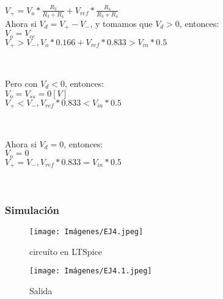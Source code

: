         $V_{+} = V_{o}*\frac{R_{3}}{R_{3} + R_{4}} + V_{ref}*\frac{R_{4}}{R_{3} + R_{4}}$\\

        Ahora si $V_{d} = V_{+} - V_{-}$, y tomamos que  $V_{d} > 0$, entonces:\\

        $V_{o} = V_{cc}$\\
        
        $V_{+} > V_{-},   V_{o}*0.166 + V_{ref}*0.833 > V_{in}*0.5$\\

        \begin{center}
            \\
        \end{center}


        Pero con $V_{d} < 0$, entonces:\\

        $V_{o} = V_{ss} = 0[V]$\\
        
        $V_{+} < V_{-},  V_{ref}*0.833 < V_{in}*0.5$\\

        \begin{center}
            \\
        \end{center}

        Ahora si $V_{d} = 0$, entonces:\\

        $V_{o} = 0$\\
        
        $V_{+} = V_{-}, V_{ref}*0.833 = V_{in}*0.5$\\

        \begin{center}
            \\
        \end{center}

        \newpage
        \subsubsection{Simulación}

        \begin{figure}[ht]
        	\centering
        	\texttt{[image: Imágenes/EJ4.jpeg]}
        	\caption{circuíto en LTSpice}
        \end{figure}

        \begin{figure}[ht]
        	\centering
        	\texttt{[image: Imágenes/EJ4.1.jpeg]}
        	\caption{Salida}
        \end{figure}
 
	\newpage

	